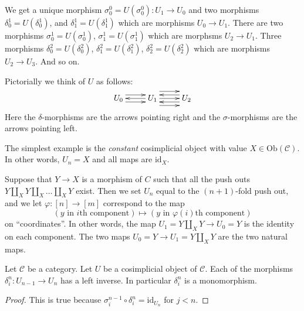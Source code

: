 \noindent
We get a unique morphism $\sigma^0_0 = U(\sigma^0_0) : U_1 \to U_0$ and
two morphisms $\delta^1_0 = U(\delta^1_0)$, and
$\delta^1_1 = U(\delta^1_1)$ which are morphisms $U_0 \to U_1$.
There are two morphisms
$\sigma^1_0 = U(\sigma^1_0)$, $\sigma^1_1 = U(\sigma^1_1)$
which are morphsms $U_2 \to U_1$. Three morphisms
$\delta^2_0 = U(\delta^2_0)$, $\delta^2_1 = U(\delta^2_1)$,
$\delta^2_2 = U(\delta^2_2)$
which are morphisms $U_2 \to U_3$. And so on.

\medskip\noindent
Pictorially we think of $U$ as follows:
$$
\xymatrix{
U_0
\ar@<1ex>[r]
\ar@<-1ex>[r]
&
U_1
\ar@<0ex>[l]
\ar@<2ex>[r]
\ar@<0ex>[r]
\ar@<-2ex>[r]
&
U_2
\ar@<1ex>[l]
\ar@<-1ex>[l]
}
$$
Here the $\delta$-morphisms are the arrows pointing right and the 
$\sigma$-morphisms are the arrows pointing left.

\begin{example}
\label{example-constant-cosimplicial-object}
The simplest example is the {\it constant} cosimplicial object with
value $X \in \text{Ob}(\mathcal{C})$. In other words, $U_n=X$ and
all maps are $\text{id}_X$.
\end{example}

\begin{example}
\label{example-push-outs-simplicial-object}
Suppose that $Y\to X$ is a morphism of $C$ such that all
the push outs $Y\coprod_X Y \coprod_X \ldots \coprod_X Y$ exist.
Then we set $U_n$ equal to the $(n + 1)$-fold push out,
and we let $\varphi: [n] \to [m]$ correspond to the map
$$
(y \text{ in }i\text{th component})
\mapsto
(y \text{ in }\varphi(i)\text{th component})
$$
on ``coordinates''.
In other words, the map $U_1 = Y \coprod_X Y \to U_0 = Y$ is the
identity on each component.
The two maps $U_0 = Y \to U_1 = Y \coprod_X Y$ are the two
natural maps.
\end{example}

\begin{lemma}
\label{lemma-di-injective}
Let $\mathcal{C}$ be a category.
Let $U$ be a cosimplicial object of $\mathcal{C}$.
Each of the morphisms $\delta^n_i : U_{n - 1} \to U_n$
has a left inverse. In particular $\delta^n_i$ is a monomorphism.
\end{lemma}

\begin{proof}
This is true because
$\sigma_i^{n - 1} \circ \delta^n_i = \text{id}_{U_n}$
for $j < n$.
\end{proof}


























